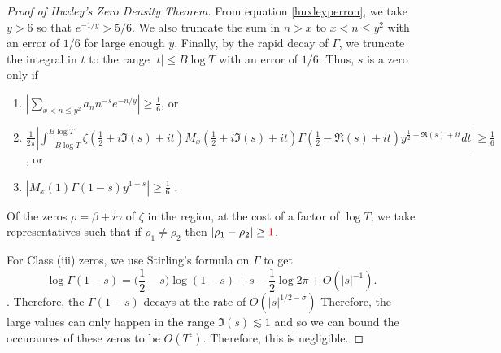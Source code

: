 \begin{proof}[Proof of Huxley's Zero Density Theorem]
    From equation \ref{huxleyperron}, we take $y>6$ so that $e^{-1/y}>5/6$. We also truncate the sum in $n>x$ to $x<n\leq y^2$ with an error of $1/6$ for large enough $y$. Finally, by the rapid decay of $\Gamma$, we truncate the integral in $t$ to the range $|t|\leq B\log T$ with an error of $1/6$. Thus, $s$ is a zero only if \begin{enumerate}[label=(\roman{*})]
        \item $|\sum_{x<n\leq y^2}a_n n^{-s} e^{-n/y}|\geq \frac{1}{6}$, or
        \item $\frac{1}{2\pi}|\int_{-B\log T}^{B\log T}\zeta(\frac{1}{2}+i\Im(s)+it)M_x(\frac{1}{2}+i\Im(s)+it) \Gamma\left(\frac{1}{2}-\Re(s)+it\right) y^{\frac{1}{2}-\Re(s)+it} dt|\geq \frac{1}{6}$, or
        \item $|M_x(1)\Gamma(1-s)y^{1-s}|\geq \frac{1}{6}$ .
    \end{enumerate}
    Of the zeros $\rho = \beta+i\gamma$ of $\zeta$ in the region, at the cost of a factor of $\log T$, we take representatives such that if $\rho_1\neq \rho_2$ then $|\rho_1-\rho_2|\geq \textcolor{red}{1}$. 

    For Class (iii) zeros, we use Stirling's formula on $\Gamma$ to get \[
        \log \Gamma(1-s) = \bigg(\frac{1}{2}-s\bigg)\log (1-s) + s - \frac{1}{2}\log 2\pi + O(|s|^{-1}).
    \]. Therefore, the $\Gamma(1-s)$ decays at the rate of $O(|s|^{1/2-\sigma})$ Therefore, the large values can only happen in the range $\Im (s)\lesssim 1$ and so we can bound the occurances of these zeros to be $O(T^\epsilon)$. Therefore, this is negligible.


\end{proof}

